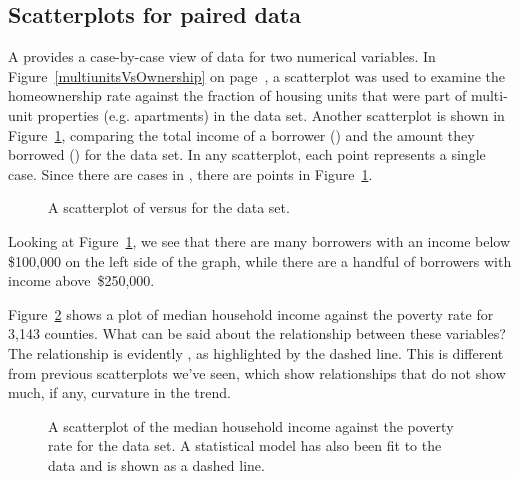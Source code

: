 \subsection{Scatterplots for paired data}
\label{scatterPlots}


A  provides a case-by-case view of data
for two numerical variables.
In Figure~\ref{multiunitsVsOwnership} on
page~\pageref{multiunitsVsOwnership}, a scatterplot
was used to examine the homeownership rate against
the fraction of housing units that were part of
multi-unit properties
(e.g. apartments) in the  data set.
Another scatterplot is shown in Figure~\ref{loan50_amt_vs_income},
comparing the total income of a borrower
() and the amount they borrowed
() for the  data set.
In any scatterplot, each point represents a single case.
Since there are \loanN{} cases in ,
there are \loanN{} points in Figure~\ref{loan50_amt_vs_income}.

\begin{figure}[h]
  \centering
  \caption{A scatterplot of 
      versus  for the
       data set.}
  \label{loan50_amt_vs_income}
\end{figure}

Looking at Figure~\ref{loan50_amt_vs_income},
we see that there are many borrowers with an income below
\$100,000 on the left side of the graph,
while there are a handful of borrowers with income above~\$250,000.

\begin{examplewrap}
\begin{nexample}{Figure~\ref{medianHHIncomePoverty}
    shows a plot of median household income
    against the poverty rate for 3,143 counties.
    What can be said about the relationship between
    these variables?}
  The relationship is evidently ,
  as highlighted by the dashed line.
  This is different from previous scatterplots we've seen,
  which show relationships that do not show much, if any,
  curvature in the trend.
\end{nexample}
\end{examplewrap}

\begin{figure}[h]
  \centering
  \caption{A scatterplot of the median household income
      against the poverty rate for the
       data set.
      A statistical model has also been fit to the data
      and is shown as a dashed line.}
  \label{medianHHIncomePoverty}
\end{figure}

